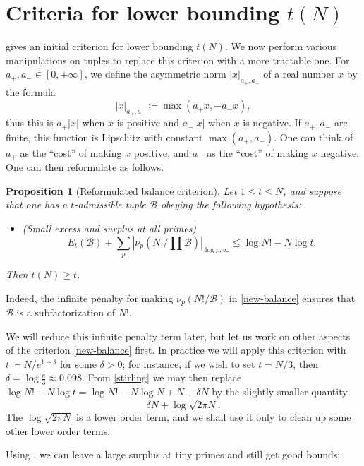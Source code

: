 \documentclass[12pt,a4paper,reqno]{amsart}
\numberwithin{equation}{section}
\theoremstyle{plain}
\newtheorem{proposition}[theorem]{Proposition}
\theoremstyle{definition}
\newcommand\tuple{{\mathcal B}}
\begin{document}
\section{Criteria for lower bounding \texorpdfstring{$t(N)$}{t(N)}}

 gives an initial criterion for lower bounding $t(N)$.  We now perform various manipulations on tuples to replace this criterion with a more tractable one.
For $a_+,a_- \in [0,+\infty]$, we define the asymmetric norm $|x|_{a_+,a_-}$ of a real number $x$ by the formula
$$ |x|_{a_+,a_-} \coloneqq \max(a_+ x, -a_- x),$$
thus this is $a_+ |x|$ when $x$ is positive and $a_- |x|$ when $x$ is negative.  If $a_+,a_-$ are finite, this function is Lipschitz with constant $\max(a_+,a_-)$.  One can think of $a_+$ as the ``cost'' of making $x$ positive, and $a_-$ as the
``cost'' of making $x$ negative.  One can then reformulate  as follows.

\begin{proposition}[Reformulated balance criterion]\label{balance-reform}  Let $1 \leq t \leq N$, and suppose that one has a $t$-admissible tuple $\tuple$ obeying the following hypothesis:
  \begin{itemize}
  \item[(i)] (Small excess and surplus at all primes)
  \begin{equation}\label{new-balance}
    E_t(\tuple) + \sum_p |\nu_p(N!/\prod \tuple)|_{\log p,\infty} \leq \log N! - N \log t.
\end{equation}
\end{itemize}
Then $t(N) \geq t$.
\end{proposition}

Indeed, the infinite penalty for making $\nu_p(N!/\tuple)$ in \eqref{new-balance} ensures that $\tuple$ is a subfactorization of $N!$.

We will reduce this infinite penalty term later, but let us work on other aspects of the criterion \eqref{new-balance} first.  In practice we will apply this criterion with $t \coloneqq N / e^{1+\delta}$ for some $\delta>0$; for instance, if we wish to set $t = N/3$, then $\delta = \log \frac{e}{3} \approx 0.098$.  From \eqref{stirling} we may then replace $\log N! - N \log t = \log N! - N \log N + N + \delta N$ by the slightly smaller quantity
$$ \delta N + \log \sqrt{2\pi N}.$$
The $\log \sqrt{2\pi N}$ is a lower order term, and we shall use it only to clean up some other lower order terms.

Using , we can leave a large surplus at tiny primes and still get good bounds:
\end{document}
